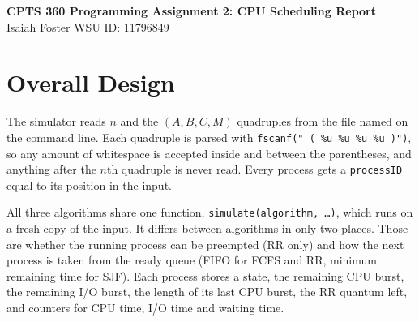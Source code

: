 \documentclass[11pt,letterpaper]{article}
\begin{document}
\begin{center}
{\large\bfseries CPTS 360 Programming Assignment 2: CPU Scheduling Report}\\[2pt]
Isaiah Foster \quad WSU ID: 11796849
\end{center}

\section{Overall Design}

The simulator reads \(n\) and the \((A,B,C,M)\) quadruples from the file named on the
command line. Each quadruple is parsed with \texttt{fscanf(" ( \%u \%u \%u \%u )")}, so any amount of
whitespace is accepted inside and between the parentheses, and anything after the \(n\)th quadruple 
is never read. Every process gets a \texttt{processID} equal to its position in the input.

All three algorithms share one function, \texttt{simulate(algorithm, \ldots)}, which runs on a fresh copy of the
input. It differs between algorithms in only two places. Those are whether the running process can be preempted (RR only)
and how the next process is taken from the ready queue (FIFO for FCFS and RR, minimum remaining time for SJF).
Each process stores a state, the remaining CPU burst, the remaining I/O burst, the length of its last CPU burst, the RR
quantum left, and counters for CPU time, I/O time and waiting time.
\end{document}
